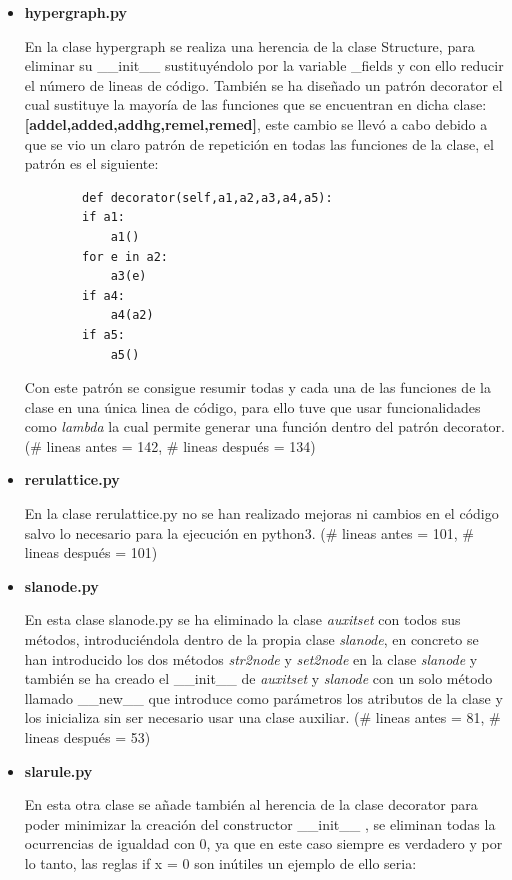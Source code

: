 \documentclass{cosas/tfg_domingo}
\begin{document}
\begin{itemize}
\item \textbf{hypergraph.py}

En la clase hypergraph se realiza una herencia de la clase Structure, para eliminar su \_\_init\_\_ sustituyéndolo por la variable \_fields y con ello reducir el número de lineas de código.
También se ha diseñado un patrón decorator el cual sustituye la mayoría de las funciones que se encuentran en dicha clase:  \textbf{[addel,added,addhg,remel,remed]}, este cambio se llevó a cabo debido a que se vio un claro patrón de repetición en todas las funciones de la clase, el patrón es el siguiente:

\begin{verbatim}
        def decorator(self,a1,a2,a3,a4,a5):
        if a1:
            a1()
        for e in a2:
            a3(e)
        if a4:
            a4(a2)
        if a5:
            a5()
\end{verbatim}

Con este patrón se consigue resumir todas y cada una de las funciones de la clase en una única linea de código, para ello tuve que usar funcionalidades como \textit{lambda} la cual permite generar una función dentro del patrón decorator. (\# lineas antes = 142, \# lineas después = 134)

\item \textbf{rerulattice.py}

En la clase rerulattice.py no se han realizado mejoras ni cambios en el código salvo lo necesario para la ejecución en python3. (\# lineas antes = 101, \# lineas después = 101)

\item \textbf{slanode.py}

En esta clase slanode.py se ha eliminado la clase \textit{auxitset} con todos sus métodos, introduciéndola dentro de la propia clase \textit{slanode}, en concreto se han introducido los dos métodos \textit{str2node} y \textit{set2node} en la clase \textit{slanode} y también se ha creado el \_\_init\_\_ de \textit{auxitset} y \textit{slanode} con un solo método llamado \_\_new\_\_ que introduce como parámetros los atributos de la clase y los inicializa sin ser necesario usar una clase auxiliar. (\# lineas antes = 81, \# lineas después = 53)

\item \textbf{slarule.py}

En esta otra clase se añade también al herencia de la clase decorator para poder minimizar la creación del constructor \_\_init\_\_ , se eliminan todas la ocurrencias de igualdad con 0, ya que en este caso siempre es verdadero y por lo tanto, las reglas if x = 0 son inútiles un ejemplo de ello seria:


\end{itemize}
\end{document}
